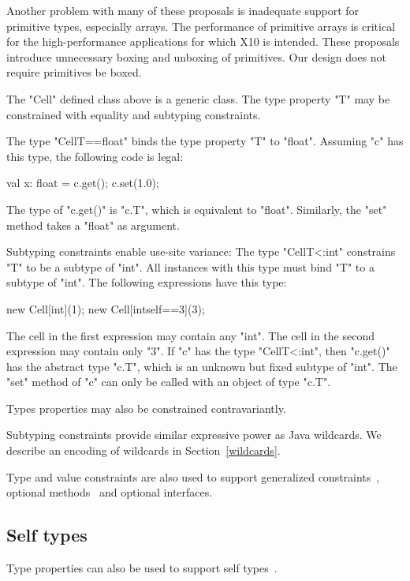 \documentclass[preprint,nocopyrightspace,9pt]{sigplanconf}
\begin{document}
Another problem with many of these proposals is inadequate support
for primitive types, especially arrays. The performance of primitive arrays is
critical for the high-performance applications for which
X10 is intended. These proposals introduce unnecessary boxing
and unboxing of primitives.
Our design does not require primitives be boxed.

The \xcd"Cell" defined class above is a generic class.
The type property \xcd"T" may be constrained with equality and
subtyping constraints.

The type \xcd"Cell{T==float}"
binds the type property \xcd"T" to \xcd"float".
Assuming \xcd"c" has this type, the following code is legal:
\begin{xten}
val x: float = c.get();
c.set(1.0);
\end{xten}
The type of \xcd"c.get()" is \xcd"c.T", which is equivalent to
\xcd"float".
Similarly, the \xcd"set" method takes a \xcd"float" as argument.

Subtyping constraints enable use-site variance:
The type \xcd"Cell{T<:int}"
constrains \xcd"T" to be a subtype of \xcd"int".
All instances with this type must bind \xcd"T" to a subtype of \xcd"int".
The following expressions have this type:
\begin{xten}
new Cell[int](1);
new Cell[int{self==3}](3);
\end{xten}
The cell in the first expression may contain any \xcd"int".
The cell in the second expression may contain only \xcd"3".
%
If \xcd"c" has the type \xcd"Cell{T<:int}",
then \xcd"c.get()" has the abstract type \xcd"c.T", which is an unknown but
fixed subtype of \xcd"int".  The \xcd"set" method of \xcd"c" can
only be called with an object of type \xcd"c.T".

Types properties may also be constrained contravariantly.

Subtyping constraints provide similar expressive power as Java
wildcards.  We describe an encoding of wildcards in
Section~\ref{wildcards}. 

Type and value constraints are also used to support generalized
constraints~\cite{emir06}, optional methods~\cite{???} and
optional interfaces.

\subsection{Self types}

Type properties can also be used to support self
types~\cite{bruce-binary,bsg95}.
\end{document}
